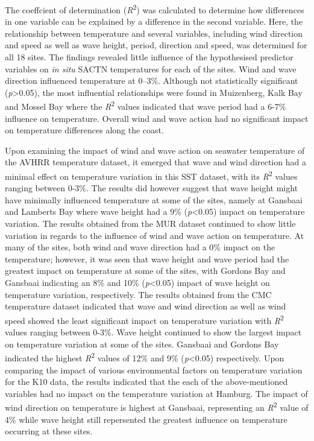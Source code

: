 \documentclass[10pt,a4paper,]{article}
\begin{document}
The coeffcient of determination (\emph{R}\textsuperscript{2}) was
calculated to determine how differences in one variable can be explained
by a difference in the second variable. Here, the relationship between
temperature and several variables, including wind direction and speed as
well as wave height, period, direction and speed, was determined for all
18 sites. The findings revealed little influence of the hypothesised
predictor variables on \emph{in situ} SACTN temperatures for each of the
sites. Wind and wave direction influenced temperature at 0--3\%.
Although not statistically significant (\emph{p}\textgreater{}0.05), the
most influential relationships were found in Muizenberg, Kalk Bay and
Mossel Bay where the \emph{R}\textsuperscript{2} values indicated that
wave period had a 6-7\% influence on temperature. Overall wind and wave
action had no significant impact on temperature differences along the
coast.

Upon examining the impact of wind and wave action on seawater
temperature of the AVHRR temperature dataset, it emerged that wave and
wind direction had a minimal effect on temperature variation in this SST
dataset, with its \emph{R}\textsuperscript{2} values ranging between
0-3\%. The results did however suggest that wave height might have
minimally influenced temperature at some of the sites, namely at
Gansbaai and Lamberts Bay where wave height had a 9\%
(\emph{p}\textless{}0.05) impact on temperature variation. The results
obtained from the MUR dataset continued to show little variation in
regards to the influence of wind and wave action on temperature. At many
of the sites, both wind and wave direction had a 0\% impact on the
temperature; however, it was seen that wave height and wave period had
the greatest impact on temperature at some of the sites, with Gordons
Bay and Gansbaai indicating an 8\% and 10\% (\emph{p}\textless{}0.05)
impact of wave height on temperature variation, respectively. The
results obtained from the CMC temperature dataset indicated that wave
and wind direction as well as wind speed showed the least significant
impact on temperature variation with \emph{R}\textsuperscript{2} values
ranging between 0-3\%. Wave height continued to show the largest impact
on temperature variation at some of the sites. Gansbaai and Gordons Bay
indicated the highest \emph{R}\textsuperscript{2} values of 12\% and 9\%
(\emph{p}\textless{}0.05) respectively. Upon comparing the impact of
various environmental factors on temperature variation for the K10 data,
the results indicated that the each of the above-mentioned variables had
no impact on the temperature variation at Hamburg. The impact of wind
direction on temperature is highest at Gansbaai, representing an
\emph{R}\textsuperscript{2} value of 4\% while wave height still
repersented the greatest influence on temperature occurring at these
sites.
\end{document}
